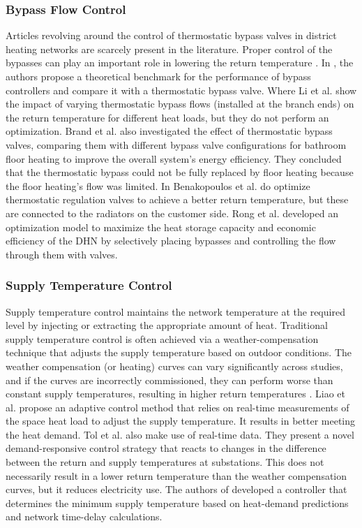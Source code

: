\subsubsection{Bypass Flow Control}
Articles revolving around the control of thermostatic bypass valves in district heating networks are scarcely present in the literature. Proper control of the bypasses can play an important role in lowering the return temperature \cite{app15062982,VANDERMEULEN201845}. In \cite{VANDERMEULEN201845}, the authors propose a theoretical benchmark for the performance of bypass controllers and compare it with a thermostatic bypass valve. Where Li et al. \cite{DTUlibrary} show the impact of varying thermostatic bypass flows (installed at the branch ends) on the return temperature for different heat loads, but they do not perform an optimization. Brand et al. \cite{BRAND2014256} also investigated the effect of thermostatic bypass valves, comparing them with different bypass valve configurations for bathroom floor heating to improve the overall system's energy efficiency. They concluded that the thermostatic bypass could not be fully replaced by floor heating because the floor heating's flow was limited. In \cite{BENAKOPOULOS2021120928} Benakopoulos et al. do optimize thermostatic regulation valves to achieve a better return temperature, but these are connected to the radiators on the customer side. Rong et al. \cite{RONG2025116197} developed an optimization model to maximize the heat storage capacity and economic efficiency of the DHN by selectively placing bypasses and controlling the flow through them with valves. 

\subsubsection{Supply Temperature Control}
Supply temperature control maintains the network temperature at the required level by injecting or extracting the appropriate amount of heat. Traditional supply temperature control is often achieved via a weather-compensation technique that adjusts the supply temperature based on outdoor conditions. The weather compensation (or heating) curves can vary significantly across studies, and if the curves are incorrectly commissioned, they can perform worse than constant supply temperatures, resulting in higher return temperatures \cite{app15062982, LIAO200555}. Liao et al. \cite{LIAO200555} propose an adaptive control method that relies on real-time measurements of the space heat load to adjust the supply temperature. It results in better meeting the heat demand. Tol et al. \cite{TOL2021105} also make use of real-time data. They present a novel demand-responsive control strategy that reacts to changes in the difference between the return and supply temperatures at substations. This does not necessarily result in a lower return temperature than the weather compensation curves, but it reduces electricity use. The authors of \cite{papaKonstantikou} developed a controller that determines the minimum supply temperature based on heat-demand predictions and network time-delay calculations. 

